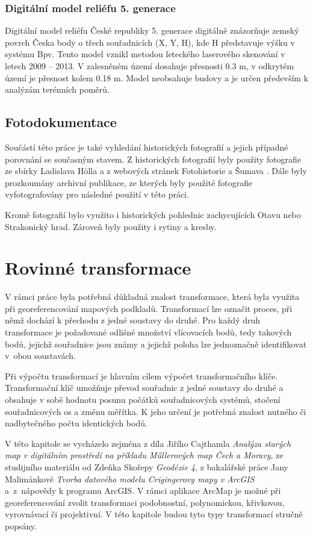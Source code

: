 \documentclass[thesis=M,czech]{FITthesis}[2012/06/26]
\begin{document}
\subsection{Digitální model reliéfu 5. generace}
Digitální model reliéfu České republiky 5. generace digitálně znázorňuje zemský povrch Česka body o třech souřadnicích (X, Y, H), kde H představuje výšku v systému Bpv. Tento model vznikl metodou leteckého laserového skenování v letech 2009 – 2013. V zalesněném území dosahuje přesnosti 0.3 m, v odkrytém území je přesnost kolem 0.18 m. Model neobsahuje budovy a je určen především k analýzám terénních poměrů. \cite{cuzk}



\section{Fotodokumentace}
Součástí této práce je také vyhledání historických fotografií a jejich případné porovnání se současným stavem. Z historických fotografií byly použity fotografie ze sbírky Ladislava Hölla a z webových stránek Fotohistorie \cite{fotohistorie} a Šumava \cite{sumava}. Dále byly prozkoumány archivní publikace, ze kterých byly použité fotografie vyfotografovány pro následné použití v této práci.

Kromě fotografií bylo využito i historických pohlednic zachycujících Otavu nebo Strakonický hrad. Zároveň byly použity i rytiny a kresby.




\chapter{Rovinné transformace}
V rámci práce byla potřebná důkladná znalost transformace, která byla využita při georeferencování mapových podkladů. Transformací lze označit proces, při němž dochází k přechodu z jedné soustavy do druhé. Pro každý druh transformace je požadované odlišné množství vlícovacích bodů, tedy takových bodů,  jejichž souřadnice jsou známy a jejichž poloha lze jednoznačně identifikovat v~obou soustavách.

Při výpočtu transformací je hlavním cílem výpočet transformačního klíče. Transformační klíč umožňuje převod souřadnic z jedné soustavy do druhé a obsahuje v sobě hodnotu posunu počátků souřadnicových systémů, stočení souřadnicových os a změnu měřítka. K jeho určení je potřebná znalost nutného či nadbytečného počtu identických bodů. 

V této kapitole se vycházelo zejména z díla Jiřího Cajthamla \textit{Analýza starých map v digitálním prostředí na příkladu Műllerových map Čech a Moravy}, ze studijního materiálu od Zdeňka Skořepy \textit{Geodézie 4}, z bakalářské práce Jany Malimánkové \textit{Tvorba datového modelu Crigingerovy mapy v ArcGIS} a~z~nápovědy k programu ArcGIS. V rámci aplikace ArcMap je možné při georeferencování zvolit transformaci podobnostní, polynomickou, křivkovou, vyrovnávací či projektivní. V této kapitole budou tyto typy transformací stručně popsány. \cite{transformace} \cite{skorepa} \cite{gis_transformace} \cite{vugtk} \cite{malimankova}
\end{document}
